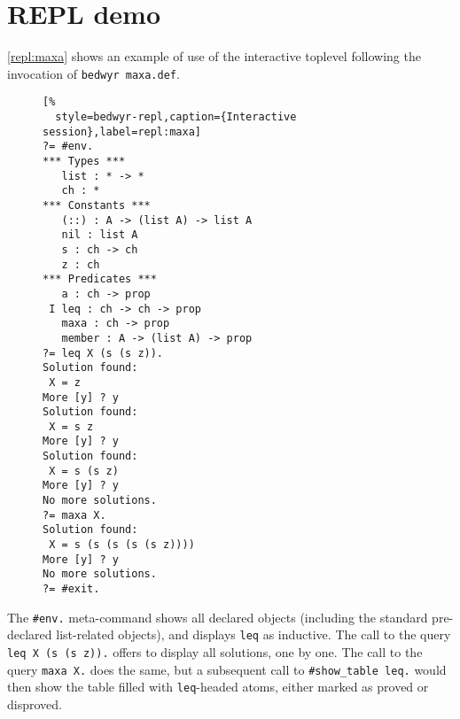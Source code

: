 \documentclass[a4paper]{article} %
\begin{document}
\section{REPL demo}

\autoref{repl:maxa} shows an example of use of the interactive toplevel
following the invocation of \verb+bedwyr maxa.def+.

\begin{figure}\begin{lstlisting}[%
  style=bedwyr-repl,caption={Interactive session},label=repl:maxa]
?= #env.
*** Types ***
   list : * -> *
   ch : *
*** Constants ***
   (::) : A -> (list A) -> list A
   nil : list A
   s : ch -> ch
   z : ch
*** Predicates ***
   a : ch -> prop
 I leq : ch -> ch -> prop
   maxa : ch -> prop
   member : A -> (list A) -> prop
?= leq X (s (s z)).
Solution found:
 X = z
More [y] ? y
Solution found:
 X = s z
More [y] ? y
Solution found:
 X = s (s z)
More [y] ? y
No more solutions.
?= maxa X.
Solution found:
 X = s (s (s (s (s z))))
More [y] ? y
No more solutions.
?= #exit.
\end{lstlisting}\end{figure}

The \lstinline+#env.+ meta-command shows all declared objects
(including the standard pre-declared list-related objects),
and displays \lstinline+leq+ as inductive.
The call to the query \lstinline+leq X (s (s z)).+ offers to display all
solutions, one by one.
The call to the query \lstinline+maxa X.+ does the same,
but a subsequent call to \lstinline+#show_table leq.+ would then show the table
filled with \lstinline+leq+-headed atoms, either marked as proved or disproved.
\end{document}
